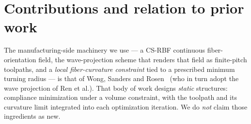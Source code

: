 \documentclass[11pt]{article}
\begin{document}
\begin{abstract}
objective raises $\omega_1$ to $3.8\times$ an equal-mass plate \emph{disproportionately}
($\omega_1^2$ up $\sim\!14\times$ against a $4.6\times$ stiffness gain) by scooping mass
from the mode's antinode --- with a compliance term keeping the structure load-bearing
rather than a field of neutral outriggers ($0.22\times$ the baseline peak stress and
compliance, and $2.2\times$ a solid plate's $\omega_1$ at $0.42\times$ its mass). The
designed anisotropy carries much of this: on a fixed topology the optimized fiber tows are
$40\%$ stiffer than the best straight layup.
We then extend the same constitutive model to \emph{periodic}
media, co-designing topology and toolpath on a Bloch cell so a chosen band is
flattened and isolated by complete gaps on both sides, and validating the design by
re-simulating the \emph{as-manufactured} cell --- cropped topology plus delineated,
exactly cell-periodic fiber tows. The complete algorithmic specification is given:
the operator inventory, both composed gradient chains, pseudocode for both
pipelines, and a data-flow diagram. We are explicit about scope: the wave-control
results are computed in \texttt{dolfinx}, while the band-structure results come
from an independent \texttt{numpy}/\texttt{scipy} Q4 code that shares the physics
and the design machinery but none of the assembly or linear algebra.
\end{abstract}

\tableofcontents

\section{Contributions and relation to prior work}
\label{sec:contrib}
The manufacturing-side machinery we use --- a CS-RBF continuous fiber-orientation
field, the wave-projection scheme that renders that field as finite-pitch
toolpaths, and a \emph{local fiber-curvature constraint} tied to a prescribed
minimum turning radius --- is that of Wong, Sanders and
Rosen~\cite{wong2025} (who in turn adopt the wave projection of Ren et al.).
That body of work designs \emph{static} structures: compliance minimization under
a volume constraint, with the toolpath and its curvature limit integrated into
each optimization iteration. We do \emph{not} claim those ingredients as new.
\end{document}
